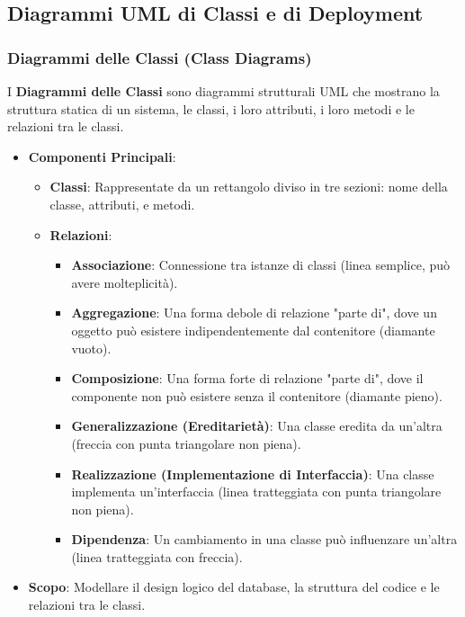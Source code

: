 \subsection{Diagrammi UML di Classi e di Deployment}

\subsubsection{Diagrammi delle Classi (Class Diagrams)}
I \textbf{Diagrammi delle Classi} sono diagrammi strutturali UML che mostrano la struttura statica di un sistema, le classi, i loro attributi, i loro metodi e le relazioni tra le classi.
\begin{itemize}
    \item \textbf{Componenti Principali}:
    \begin{itemize}
        \item \textbf{Classi}: Rappresentate da un rettangolo diviso in tre sezioni: nome della classe, attributi, e metodi.
        \item \textbf{Relazioni}:
        \begin{itemize}
            \item \textbf{Associazione}: Connessione tra istanze di classi (linea semplice, può avere molteplicità).
            \item \textbf{Aggregazione}: Una forma debole di relazione "parte di", dove un oggetto può esistere indipendentemente dal contenitore (diamante vuoto).
            \item \textbf{Composizione}: Una forma forte di relazione "parte di", dove il componente non può esistere senza il contenitore (diamante pieno).
            \item \textbf{Generalizzazione (Ereditarietà)}: Una classe eredita da un'altra (freccia con punta triangolare non piena).
            \item \textbf{Realizzazione (Implementazione di Interfaccia)}: Una classe implementa un'interfaccia (linea tratteggiata con punta triangolare non piena).
            \item \textbf{Dipendenza}: Un cambiamento in una classe può influenzare un'altra (linea tratteggiata con freccia).
        \end{itemize}
    \end{itemize}
    \item \textbf{Scopo}: Modellare il design logico del database, la struttura del codice e le relazioni tra le classi.
\end{itemize}

